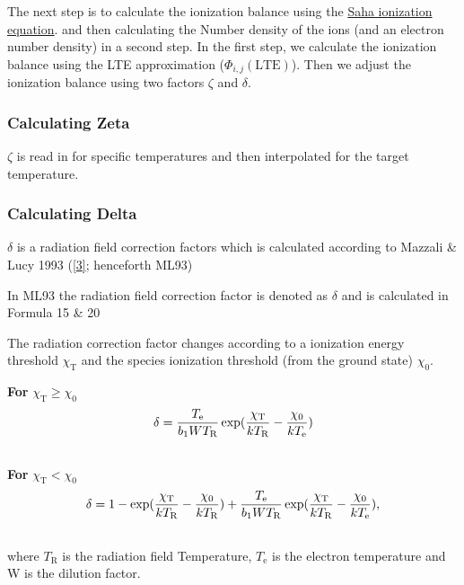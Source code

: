 \documentclass[letterpaper,10pt,english]{sphinxmanual}
\begin{document}
The next step is to calculate the ionization balance using the \href{http://en.wikipedia.org/wiki/Saha\_ionization\_equation}{Saha ionization equation}.
and then calculating the Number density of the ions (and an electron number density) in a second step.
In the first step, we calculate the ionization balance using the LTE approximation ($\Phi_{i, j}(\textrm{LTE})$). Then we adjust the ionization balance using
two factors $\zeta$ and $\delta$.


\subsubsection{Calculating Zeta}
\label{plasma_doc/nebular_plasma:calc-zeta-label}\label{plasma_doc/nebular_plasma:calculating-zeta}
$\zeta$ is read in for specific temperatures and then interpolated for the target temperature.


\subsubsection{Calculating Delta}
\label{plasma_doc/nebular_plasma:calculating-delta}
$\delta$ is a radiation field correction factors which is calculated according to Mazzali \& Lucy 1993 ({\hyperref[zreferences:a-a-279-447m]{{[}3{]}}}; henceforth ML93)

In ML93 the radiation field correction factor is denoted as $\delta$ and is calculated in Formula 15 \& 20

The radiation correction factor changes according to a ionization energy threshold $\chi_\textrm{T}$
and the species ionization threshold (from the ground state) $\chi_0$.

\textbf{For} $\chi_\textrm{T} \ge \chi_0$
\begin{gather}
\begin{split}\delta = \frac{T_\textrm{e}}{b_1 W T_\textrm{R}} \exp(\frac{\chi_\textrm{T}}{k T_\textrm{R}} -
\frac{\chi_0}{k T_\textrm{e}})\end{split}\notag\\\begin{split}\end{split}\notag
\end{gather}
\textbf{For} $\chi_\textrm{T} < \chi_0$
\begin{gather}
\begin{split}\delta = 1 - \exp(\frac{\chi_\textrm{T}}{k T_\textrm{R}} - \frac{\chi_0}{k T_\textrm{R}}) +
\frac{T_\textrm{e}}{b_1 W T_\textrm{R}} \exp(\frac{\chi_\textrm{T}}{k T_\textrm{R}} -
\frac{\chi_0}{k T_\textrm{e}}),\end{split}\notag\\\begin{split}\end{split}\notag
\end{gather}
where $T_\textrm{R}$ is the radiation field Temperature, $T_\textrm{e}$ is the electron temperature and W is the
dilution factor.
\end{document}
